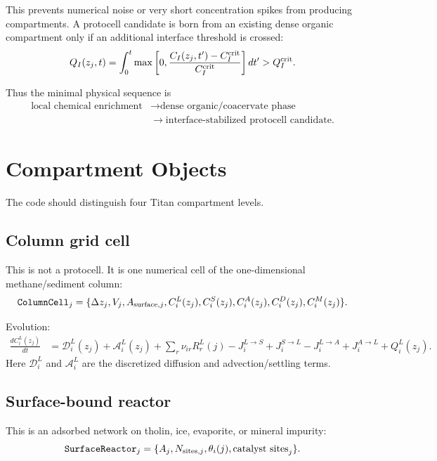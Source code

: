 \documentclass[11pt]{article}
\begin{document}
This prevents numerical noise or very short concentration spikes from producing compartments. A protocell candidate is born from an existing dense organic compartment only if an additional interface threshold is crossed:
\begin{equation}
Q_I(z_j,t)
=
\int_0^t
\max\left[
0,
\frac{C_I(z_j,t')-C_I^{\rm crit}}{C_I^{\rm crit}}
\right]dt'
>
Q_I^{\rm crit}.
\end{equation}

Thus the minimal physical sequence is
\begin{align}
\text{local chemical enrichment}
&\rightarrow
\text{dense organic/coacervate phase}
\nonumber\\
&\rightarrow
\text{interface-stabilized protocell candidate}.
\end{align}

\section{Compartment Objects}

The code should distinguish four Titan compartment levels.

\subsection{Column grid cell}

This is not a protocell. It is one numerical cell of the one-dimensional methane/sediment column:
\begin{equation}
\texttt{ColumnCell}_j
=
\{\Delta z_j,V_j,A_{{\rm surface},j},C_i^L(z_j),C_i^S(z_j),C_i^A(z_j),C_i^D(z_j),C_i^M(z_j)\}.
\end{equation}

Evolution:
\begin{align}
\frac{dC_i^L(z_j)}{dt}
&=
\mathcal{D}_i^L(z_j)
+
\mathcal{A}_i^L(z_j)
+
\sum_r \nu_{ir}R_r^L(j)
-J_i^{L\rightarrow S}
+J_i^{S\rightarrow L}
-J_i^{L\rightarrow A}
+J_i^{A\rightarrow L}
+Q_i^L(z_j).
\end{align}
Here $\mathcal{D}_i^L$ and $\mathcal{A}_i^L$ are the discretized diffusion and advection/settling terms.

\subsection{Surface-bound reactor}

This is an adsorbed network on tholin, ice, evaporite, or mineral impurity:
\begin{equation}
\texttt{SurfaceReactor}_j
=
\{A_j,N_{{\rm sites},j},\theta_i(j),\text{catalyst sites}_j\}.
\end{equation}
\end{document}
